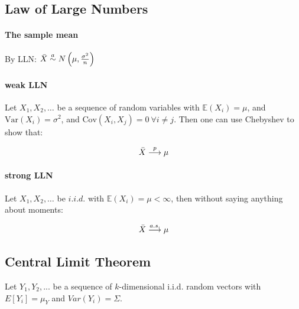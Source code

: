 
\subsection{Law of Large Numbers}

\paragraph{The sample mean}

By LLN: $\Bar{X} \stackrel{a}{\sim} N\left( \mu, \frac{\sigma^2}{n} \right)$

\paragraph{weak LLN}

Let $X_1, X_2, \dots$ be a sequence of random variables with $\mathbb{E}(X_i) = \mu$, and $\text{Var}(X_i)=\sigma^2$, and $\text{Cov}(X_i, X_j)=0 \: \forall i\neq j$. Then one can use Chebyshev to show that:

\begin{align*}
    \Bar{X} \stackrel{p}{\longrightarrow} \mu
\end{align*}

\paragraph{strong LLN}

Let $X_1, X_2, \dots$ be $i.i.d.$ with $\mathbb{E}(X_i) = \mu < \infty$, then without saying anything about  moments:

\begin{align*}
    \Bar{X} \stackrel{a.s.}{\longrightarrow} \mu
\end{align*}

\subsection{Central Limit Theorem}
Let $Y_1,Y_2,...$ be a sequence of $k$-dimensional i.i.d. random vectors with $E[Y_i]=\mu_Y$ and $Var(Y_i) = \Sigma$.


